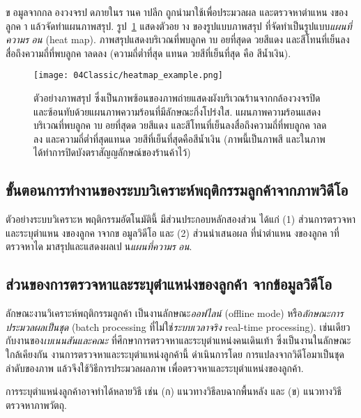 ขอมูลจากกลองวงจรปดภายในรานคาปลีก 
ถูกนำมาใช้เพื่อประมวลผล และตรวจหาตำแหนงของลูกคา
แล้วจัดทำแผนภาพสรุป. 
รูป~\ref{fig: classic heatmap example} แสดงตัวอยาง ของรูปแบบภาพสรุป ที่จัดทำเป็นรูปแบบ\textit{แผนที่ความรอน} (heat map). 
ภาพสรุปแสดงบริเวณที่พบลูกคาบอยที่สุดดวยสีแดง
และสีโทนที่เย็นลงสื่อถึงความถี่ที่พบลูกคาลดลง (ความถี่ต่ำที่สุด แทนดวยสีที่เย็นที่สุด คือ สีน้ำเงิน). 

%
\begin{figure}
\begin{center}
\texttt{[image: 04Classic/heatmap\_example.png]}
\caption[แผนภาพความร้อน]{ตัวอย่างภาพสรุป ซึ่งเป็นภาพซ้อนของภาพถ่ายแสดงผังบริเวณร้านจากกล้องวงจรปิด และซ้อนทับด้วยแผนภาพความร้อนที่มีลักษณะกึ่งโปร่งใส.
แผนภาพความร้อนแสดงบริเวณที่พบลูกคาบอยที่สุดดวยสีแดง
และสีโทนที่เย็นลงสื่อถึงความถี่ที่พบลูกคาลดลง 
และความถี่ต่ำที่สุดแทนดวยสีที่เย็นที่สุดคือสีน้ำเงิน
(ภาพนี้เป็นภาพสี และในภาพได้ทำการปิดบังตราสัญญลักษณ์ของร้านค้าไว้)
}
\label{fig: classic heatmap example}
\end{center}
\end{figure}
%

\subsection{ขั้นตอนการทำงานของระบบวิเคราะห์พฤติกรรมลูกค้าจากภาพวิดีโอ}

ตัวอย่างระบบวิเคราะหพฤติกรรมอัตโนมัตินี้ มีส่วนประกอบหลักสองส่วน ได้แก่
(1) ส่วนการตรวจหาและระบุตำแหนงของลูกคาจากขอมูลวิดีโอ
และ (2) ส่วนนำเสนอผล ที่นำตำแหนงของลูกคาที่ตรวจหาไดมาสรุปและแสดงผลเปน\textit{แผนที่ความรอน}.

\subsection{ส่วนของการตรวจหาและระบุตำแหน่งของลูกค้า จากข้อมูลวิดีโอ}
\label{sec: classic task 1}

ลักษณะงานวิเคราะห์พฤติกรรมลูกค้า เป็นงานลักษณะ\textit{ออฟไลน์} (offline mode) 
หรือ\textit{ลักษณะการประมวลผลเป็นชุด} (batch processing ที่ไม่ใช่\textit{ระบบเวลาจริง} real-time processing).
เช่นเดียวกับงานของ\textit{เบเนนสันและคณะ}\cite{BenensonEtAl2014a} ที่ศึกษาการตรวจหาและระบุตำแหน่งคนเดินเท้า
ซึ่งเป็นงานในลักษณะใกล้เคียงกัน
งานการตรวจหาและระบุตำแหน่งลูกค้านี้ ดำเนินการโดย
การแปลงจากวิดีโอมาเป็นชุดลำดับของภาพ แล้วจึงใช้วิธีการประมวลผลภาพ เพื่อตรวจหาและระบุตำแหน่งของลูกค้า. 

การระบุตำแหน่งลูกค้าอาจทำได้หลายวิธี
เช่น 
(ก) แนวทางวิธีลบฉากพื้นหลัง
และ (ข) แนวทางวิธีตรวจหาภาพวัตถุ.

